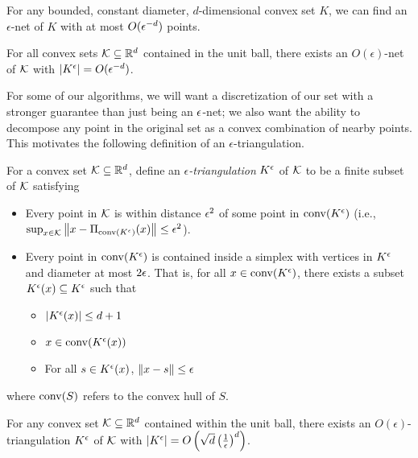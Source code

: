 \documentclass[final,12pt]{alt2025}
\begin{document}
For any bounded, constant diameter, $d$-dimensional convex set $K$, we can find an $\epsilon$-net of $K$ with at most $O(\epsilon^{-d})$ points.

\begin{lemma}\label{lem:eps-net}
For all convex sets $\mathcal{K} \subseteq \mathbb{R}^d$ contained in the unit ball, there exists an $O(\epsilon)$-net of $\mathcal{K}$ with $|K^{\epsilon}| = O(\epsilon^{-d})$. 
\end{lemma}




For some of our algorithms, we will want a discretization of our set with a stronger guarantee than just being an $\epsilon$-net; we also want the ability to decompose any point in the original set as a convex combination of nearby points. This motivates the following definition of an $\epsilon$-triangulation.

\begin{definition}\label{def:et}
    For a convex set $\mathcal{K} \subseteq \mathbb{R}^d$, define an \emph{$\epsilon$-triangulation} $K^{\epsilon}$ of $\mathcal{K}$ to be a finite subset of $\mathcal{K}$ satisfying
    \begin{itemize}
        
        \item \sloppy Every point in $\mathcal{K}$ is within distance $\epsilon^2$ of some point in $\mathrm{conv}(K^{\epsilon})$ (i.e., $\sup_{x \in \mathcal{K}} \left\|x - \Pi_{\mathrm{conv}(K^{\epsilon})}(x)\right\| \leq \epsilon^2$).
        \item Every point in $\mathrm{conv}(K^{\epsilon})$ is contained inside a simplex with vertices in $K^{\epsilon}$ and diameter at most $2\epsilon$. That is, for all $x \in \mathrm{conv}(K^{\epsilon})$, there exists a subset $K^{\epsilon}(x) \subseteq K^{\epsilon}$ such that
        \begin{itemize}
            \item $|K^{\epsilon}(x)| \leq d+1$
            \item $x \in \mathrm{conv}(K^{\epsilon}(x))$
            \item For all $s \in K^{\epsilon}(x)$, $\left\|x-s\right\| \leq \epsilon$
        \end{itemize}
    \end{itemize}
    where $\mathrm{conv}(S)$ refers to the convex hull of $S$.
\end{definition}

\begin{lemma}\label{lemma:triangulation}
    For any convex set $\mathcal{K} \subseteq \mathbb{R}^d$ contained within the unit ball, there exists an $O(\epsilon)$-triangulation $K^{\epsilon}$ of $\mathcal{K}$ with $|K^{\epsilon}| = O\left(\sqrt{d}\left(\frac{1}{\epsilon}\right)^d\right)$.
\end{lemma}
\end{document}
